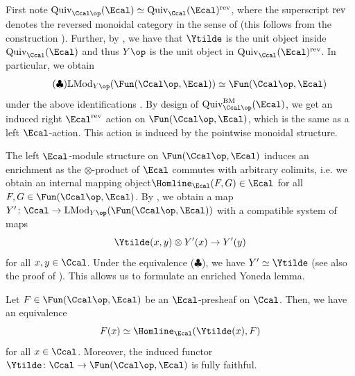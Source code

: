 \documentclass[colorinlistoftodos,article,11pt,reqno]{article}
\begin{document}
\begin{appendix}
First note $\textup{Quiv}_{\Ccal\op}(\Ecal)\simeq \textup{Quiv}_{\Ccal}(\Ecal)^{\textup{rev}}$,
where the superscript $\textup{rev}$ denotes the reversed monoidal category in the sense of \cite[Rem. 4.1.1.7]{HA} (this follows from the construction \cite[\S 6.2.1]{Hinich}). Further, by \cite[\S 4.7.3]{Hinich}, we have that $\Ytilde$ is the unit object inside  $\textup{Quiv}_{\Ccal}(\Ecal)$ and thus $Y\op$ is the unit object in $\textup{Quiv}_{\Ccal}(\Ecal)^{\textup{rev}}$. In particular, we obtain
\begin{equation}\tag{$\clubsuit$}
    \textup{LMod}_{Y\op}(\Fun(\Ccal\op,\Ecal))\simeq \Fun(\Ccal\op,\Ecal)
\end{equation}
under the above identifications \cite[Prop. 4.2.4.9]{HA}.
By design of $\textup{Quiv}_{\Ccal\op}^{\textup{BM}}(\Ecal)$, we get an induced right $\Ecal^{\textup{rev}}$ action on $\Fun(\Ccal\op,\Ecal)$, which is the same as a left $\Ecal$-action. This action is induced by the pointwise monoidal structure.

The left $\Ecal$-module structure on $\Fun(\Ccal\op,\Ecal)$ induces an enrichment as the $\otimes$-product of $\Ecal$ commutes with arbitrary colimits, i.e. we obtain an internal mapping object\linebreak $\Homline_{\Ecal}(F,G)\in \Ecal$ for all $F,G\in \Fun(\Ccal\op,\Ecal)$. By \cite[\S 6.2.4]{Hinich}, we obtain a map $Y'\colon \Ccal\rightarrow \textup{LMod}_{Y\op}(\Fun(\Ccal\op,\Ecal))$ with a compatible system of maps 
$$
    \Ytilde(x,y) \otimes Y'(x)\rightarrow Y'(y)
$$
for all $x,y\in \Ccal$. Under the equivalence ($\clubsuit$), we have $Y'\simeq \Ytilde$ \cite[\S 4.7.4]{Hinich} (see also the proof of \cite[6.2.6 Cor.]{Hinich}). This allows us to formulate an enriched Yoneda lemma.

\begin{lem}
\label{lem-yoneda}
    Let $F\in \Fun(\Ccal\op,\Ecal)$ be an $\Ecal$-presheaf on $\Ccal$. Then, we have an equivalence 
    $$
        F(x)\simeq \Homline_{\Ecal}(\Ytilde(x),F)
    $$
    for all $x\in \Ccal$. Moreover, the induced functor $\Ytilde\colon \Ccal\rightarrow \Fun(\Ccal\op,\Ecal)$ is fully faithful. 
\end{lem}

\end{appendix}





\end{document}
